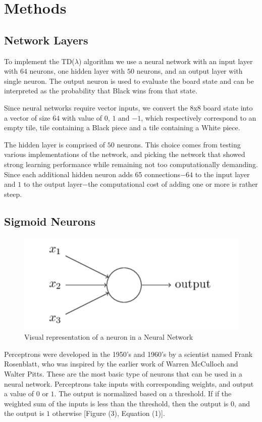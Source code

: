 \documentclass{sig-alternate-05-2015}
\begin{document}
\section{Methods}

\subsection{Network Layers}
 
To implement the TD(\(\lambda\)) algorithm we use a neural network with an input layer with $64$ neurons, one hidden layer with $50$ neurons, and an output layer with single neuron. The output neuron is used to evaluate the board state and can be interpreted as the probability that Black wins from that state.

Since neural networks require vector inputs, we convert the 8x8 board state into a vector of size $64$ with value of $0$, $1$ and $-1$, which respectively correspond to an empty tile, tile containing a Black piece and a tile containing a White piece.

The hidden layer is comprised of $50$ neurons. This choice comes from testing various implementations of the network, and picking the network that showed strong learning performance while remaining not too computationally demanding. Since each additional hidden neuron adds 65 connections$-$$64$ to the input layer and $1$ to the output layer$-$the computational cost of adding one or more is rather steep.
 
\subsection{Sigmoid Neurons}
\begin{figure}[h!]
  \includegraphics[width=\linewidth]{neuron.png}
  \caption{Visual representation of a neuron in a Neural Network}
  \label{fig:neuron4}
\end{figure}
 
        	Perceptrons were developed in the 1950's and 1960's by a scientist named Frank Rosenblatt, who was inspired by the earlier work of Warren McCulloch and Walter Pitts. These are the most basic type of neurons that can be used in a neural network. Perceptrons take inputs with corresponding weights, and output a value of $0$ or $1$. The output is normalized based on a threshold. If if the weighted sum of the inputs is less than the threshold, then the output is $0$, and the output is $1$ otherwise [Figure (3), Equation (1)]\cite{rosenblatt1958perceptron}.
\end{document}
